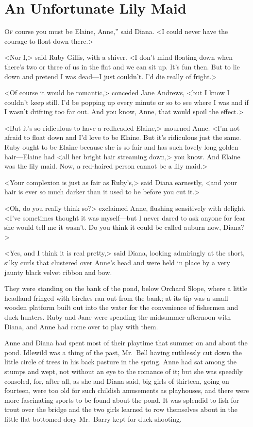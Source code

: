 \chapter{An Unfortunate Lily Maid}

\lettrine[ante=“,]{O}{f} course you must be Elaine, Anne,” said Diana. <I could never have the courage to float down there.>

\zz
<Nor I,> said Ruby Gillis, with a shiver. <I don't mind floating down when there's two or three of us in the flat and we can sit up. It's fun then. But to lie down and pretend I was dead—I just couldn't. I'd die really of fright.>

<Of course it would be romantic,> conceded Jane Andrews, <but I know I couldn't keep still. I'd be popping up every minute or so to see where I was and if I wasn't drifting too far out. And you know, Anne, that would spoil the effect.>

<But it's so ridiculous to have a redheaded Elaine,> mourned Anne. <I'm not afraid to float down and I'd love to be Elaine. But it's ridiculous just the same. Ruby ought to be Elaine because she is so fair and has such lovely long golden hair—Elaine had <all her bright hair streaming down,> you know. And Elaine was the lily maid. Now, a red-haired person cannot be a lily maid.>

<Your complexion is just as fair as Ruby's,> said Diana earnestly, <and your hair is ever so much darker than it used to be before you cut it.>

<Oh, do you really think so?> exclaimed Anne, flushing sensitively with delight. <I've sometimes thought it was myself—but I never dared to ask anyone for fear she would tell me it wasn't. Do you think it could be called auburn now, Diana?>

<Yes, and I think it is real pretty,> said Diana, looking admiringly at the short, silky curls that clustered over Anne's head and were held in place by a very jaunty black velvet ribbon and bow.

They were standing on the bank of the pond, below Orchard Slope, where a little headland fringed with birches ran out from the bank; at its tip was a small wooden platform built out into the water for the convenience of fishermen and duck hunters. Ruby and Jane were spending the midsummer afternoon with Diana, and Anne had come over to play with them.

Anne and Diana had spent most of their playtime that summer on and about the pond. Idlewild was a thing of the past, Mr.~Bell having ruthlessly cut down the little circle of trees in his back pasture in the spring. Anne had sat among the stumps and wept, not without an eye to the romance of it; but she was speedily consoled, for, after all, as she and Diana said, big girls of thirteen, going on fourteen, were too old for such childish amusements as playhouses, and there were more fascinating sports to be found about the pond. It was splendid to fish for trout over the bridge and the two girls learned to row themselves about in the little flat-bottomed dory Mr.~Barry kept for duck shooting.

